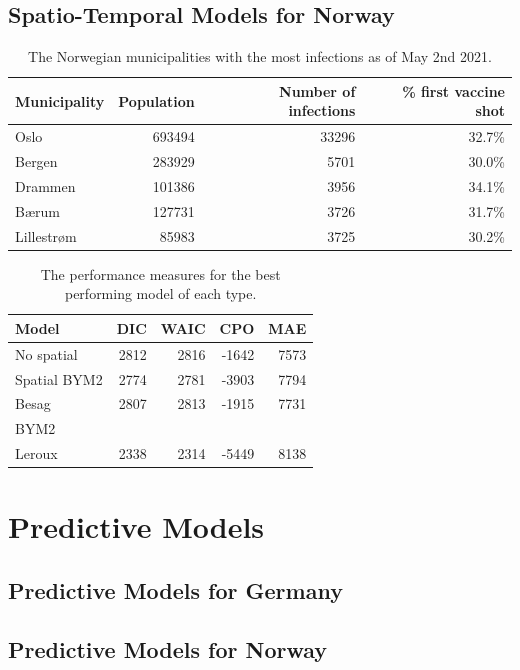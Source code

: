 \subsection{Spatio-Temporal Models for Norway}
\begin{table}[H] 
\caption{The Norwegian municipalities with the most infections as of May 2nd 2021. \label{top5norway_temporal}}
\begin{tabular}{l r r r}
\toprule
\textbf{Municipality}	& \textbf{Population}	& \textbf{Number of infections} &\textbf{\% first vaccine shot} \\
\midrule
Oslo & 693494 & 33296 & 32.7\%\\
Bergen & 283929 & 5701 & 30.0\%\\
Drammen & 101386 & 3956 & 34.1\%\\
Bærum & 127731 & 3726 & 31.7\%\\
Lillestrøm & 85983 & 3725 & 30.2\%\\
\bottomrule
\end{tabular}
\end{table}
\begin{table}[H] 
\caption{The performance measures for the best performing model of each type. \label{allNorway_temporal}}
\begin{tabular}{l r r r r}
\toprule
\textbf{Model}	& \textbf{DIC}	& \textbf{WAIC} & \textbf{CPO} & \textbf{MAE} \\
\midrule
No spatial & 2812 & 2816 & -1642 & 7573 \\
Spatial BYM2 & 2774 & 2781 & -3903 & 7794\\
Besag & 2807 & 2813 & -1915 & 7731 \\
BYM2 \\
Leroux & 2338 & 2314 & -5449 & 8138\\
\bottomrule
\end{tabular}
\end{table}
\clearpage
\section{Predictive Models}
\subsection{Predictive Models for Germany}
\subsection{Predictive Models for Norway}